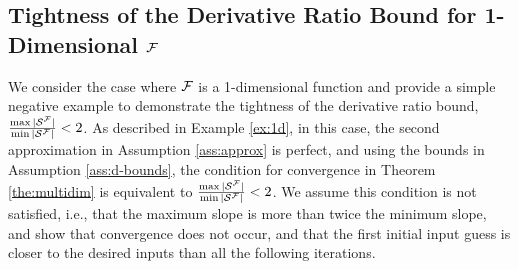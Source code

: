 \documentclass[nohyperref]{article}
\begin{document}
\subsection{Tightness of the Derivative Ratio Bound for 1-Dimensional $\mathcal{F}$}
We consider the case where $\mathcal{F}$ is a 1-dimensional function and provide a simple negative example to demonstrate the tightness of the derivative ratio bound, $\frac{\max |\mathcal{S}^{\mathcal{F}}|}{\min |\mathcal{S}^{\mathcal{F}}|}< 2$. As described in Example \ref{ex:1d}, in this case, the second approximation in Assumption \ref{ass:approx} is perfect, and using the bounds in Assumption \ref{ass:d-bounds}, the condition for convergence in Theorem \ref{the:multidim} is equivalent to $\frac{\max |\mathcal{S}^{\mathcal{F}}|}{\min |\mathcal{S}^{\mathcal{F}}|}< 2$. We assume this condition is not satisfied, i.e., that the maximum slope is more than twice the minimum slope, and show that convergence does not occur, and that the first initial input guess is closer to the desired inputs than all the following iterations. 
\end{document}
